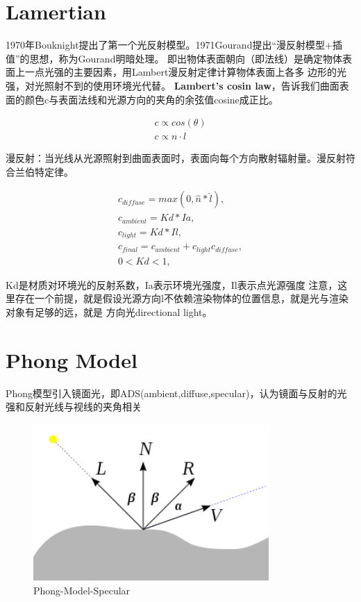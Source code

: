 \section{Lamertian}
1970年Bouknight提出了第一个光反射模型。1971Gourand提出“漫反射模型+插值”的思想，称为Gourand明暗处理。
即出物体表面朝向（即法线）是确定物体表面上一点光强的主要因素，用Lambert漫反射定律计算物体表面上各多
边形的光强，对光照射不到的使用环境光代替。
\textbf{Lambert's cosin law}，告诉我们曲面表面的颜色c与表面法线和光源方向的夹角的余弦值cosine成正比。

\begin{align*}
c \propto cos(\theta) \\
c \propto n \cdot l 
\end{align*}

漫反射：当光线从光源照射到曲面表面时，表面向每个方向散射辐射量。漫反射符合兰伯特定律。

\begin{align*}    
c_{diffuse} = max(0, \hat{n} * \hat{l}), \\
c_{ambient} = Kd * Ia, \\
c_{light} = Kd * Il, \\ 
c_{final} = c_{ambient} + c_{light}c_{diffuse}, \\
0 < Kd < 1, 
\end{align*}

Kd是材质对环境光的反射系数，Ia表示环境光强度，Il表示点光源强度
注意，这里存在一个前提，就是假设光源方向l不依赖渲染物体的位置信息，就是光与渲染对象有足够的远，就是
方向光directional light。

\section{Phong Model}

Phong模型引入镜面光，即ADS(ambient,diffuse,specular)，认为镜面与反射的光强和反射光线与视线的夹角相关

\begin{figure}[htbp]
    \centering
    \includegraphics[width=0.8\textwidth]{images/phong-shading-model.png}
    \caption{Phong-Model-Specular}\label{Phong-Model-Specular}
\end{figure}

